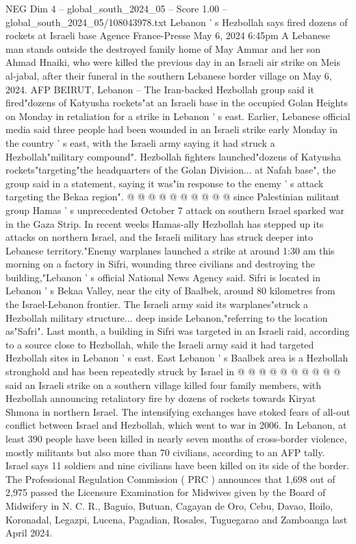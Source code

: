 \begin{textsample}{NEG Dim 4 – global\_south\_2024\_05 – Score 1.00 – global\_south\_2024\_05/108043978.txt}  \label{ex:f4_neg_254}
Lebanon ' s Hezbollah says fired dozens of rockets at Israeli base Agence France-Presse May 6, 2024 6:45pm A Lebanese man stands outside the destroyed family home of May Ammar and her son Ahmad Hnaiki, who were killed the previous day in an Israeli air strike on Meis al-jabal, after their funeral in the southern Lebanese border village on May 6, 2024.
AFP BEIRUT, Lebanon -- The Iran-backed Hezbollah group said it fired"dozens of Katyusha rockets"at an Israeli base in the occupied Golan Heights on Monday in retaliation for a strike in Lebanon ' s east.
Earlier, Lebanese official media said three people had been wounded in an Israeli strike early Monday in the country ' s east, with the Israeli army saying it had struck a Hezbollah"military compound".
Hezbollah fighters launched"dozens of Katyusha rockets"targeting"the headquarters of the Golan Division... at Nafah base", the group said in a statement, saying it was"in response to the enemy ' s attack targeting the Bekaa region". @ @ @ @ @ @ @ @ @ @ since Palestinian militant group Hamas ' s unprecedented October 7 attack on southern Israel sparked war in the Gaza Strip.
In recent weeks Hamas-ally Hezbollah has stepped up its attacks on northern Israel, and the Israeli military has struck deeper into Lebanese territory."Enemy warplanes launched a strike at around 1:30 am this morning on a factory in Sifri, wounding three civilians and destroying the building,"Lebanon ' s official National News Agency said.
Sifri is located in Lebanon ' s Bekaa Valley, near the city of Baalbek, around 80 kilometres from the Israel-Lebanon frontier.
The Israeli army said its warplanes"struck a Hezbollah military structure... deep inside Lebanon,"referring to the location as"Safri".
Last month, a building in Sifri was targeted in an Israeli raid, according to a source close to Hezbollah, while the Israeli army said it had targeted Hezbollah sites in Lebanon ' s east.
East Lebanon ' s Baalbek area is a Hezbollah stronghold and has been repeatedly struck by Israel in @ @ @ @ @ @ @ @ @ @ said an Israeli strike on a southern village killed four family members, with Hezbollah announcing retaliatory fire by dozens of rockets towards Kiryat Shmona in northern Israel.
The intensifying exchanges have stoked fears of all-out conflict between Israel and Hezbollah, which went to war in 2006.
In Lebanon, at least 390 people have been killed in nearly seven months of cross-border violence, mostly militants but also more than 70 civilians, according to an AFP tally.
Israel says 11 soldiers and nine civilians have been killed on its side of the border.
The Professional Regulation Commission ( PRC ) announces that 1,698 out of 2,975 passed the Licensure Examination for Midwives given by the Board of Midwifery in N.
C.
R., Baguio, Butuan, Cagayan de Oro, Cebu, Davao, Iloilo, Koronadal, Legazpi, Lucena, Pagadian, Rosales, Tuguegarao and Zamboanga last April 2024.

\end{textsample}
